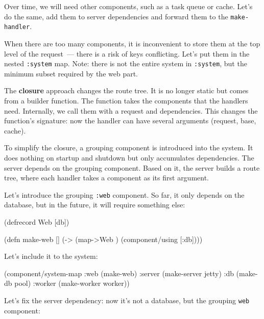 \fi

Over time, we will need other components, such as a task queue or cache. Let's do the same, add them to server dependencies and forward them to the \verb|make-handler|.


When there are too many components, it is inconvenient to store them at the top level of the request~--- there is a risk of keys conflicting. Let's put them in the nested \verb|:system| map. Note: there is not the entire system in \verb|:system|, but the minimum subset required by the web part.


The \textbf{closure} approach changes the route tree. It is no longer static but comes from a builder function. The function takes the components that the handlers need. Internally, we call them with a request and dependencies. This changes the function's signature: now the handler can have several arguments (request, base, cache).

To simplify the closure, a grouping component is introduced into the system. It does nothing on startup and shutdown but only accumulates dependencies. The server depends on the grouping component. Based on it, the server builds a route tree, where each handler takes a component as its first argument.

Let's introduce the grouping \verb|:web| component. So far, it only depends on the database, but in the future, it will require something else:

\begin{english}
  \begin{clojure}
(defrecord Web [db])

(defn make-web []
  (-> (map->Web {})
      (component/using [:db])))
  \end{clojure}
\end{english}

\noindent
Let's include it to the system:

\begin{english}
  \begin{clojure}
(component/system-map
 :web    (make-web)
 :server (make-server jetty)
 :db     (make-db pool)
 :worker (make-worker worker))
  \end{clojure}
\end{english}


Let's fix the server dependency: now it's not a database, but the grouping \verb|web| component:

